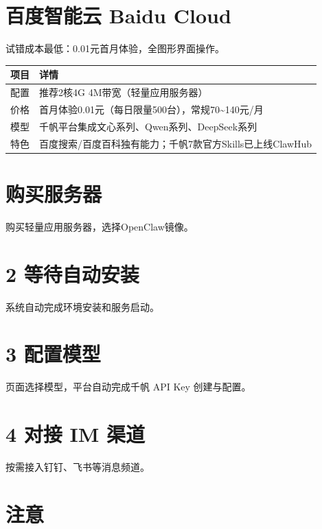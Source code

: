 \documentclass[
  10
]{article}
\newcounter{none} %
\begin{document}
\section{百度智能云 Baidu
Cloud}\label{ux767eux5ea6ux667aux80fdux4e91-baidu-cloud}

试错成本最低：0.01元首月体验，全图形界面操作。

{\def\LTcaptype{none} %
\begin{longtable}[]{@{}|l|l|@{}}
\toprule\noalign{}
\endhead
\bottomrule\noalign{}
\endlastfoot
\hline
项目 & 详情 \\
\hline
配置 & 推荐2核4G 4M带宽（轻量应用服务器） \\
\hline
价格 & 首月体验0.01元（每日限量500台），常规70\textasciitilde140元/月 \\
\hline
模型 & 千帆平台集成文心系列、Qwen系列、DeepSeek系列 \\
\hline
特色 & 百度搜索/百度百科独有能力；千帆7款官方Skills已上线ClawHub \\
\hline
\end{longtable}
}

\section{购买服务器}\label{ux8d2dux4e70ux670dux52a1ux5668}

购买轻量应用服务器，选择OpenClaw镜像。

\section{2 等待自动安装}\label{ux7b49ux5f85ux81eaux52a8ux5b89ux88c5}

系统自动完成环境安装和服务启动。

\section{3 配置模型}\label{ux914dux7f6eux6a21ux578b}

页面选择模型，平台自动完成千帆 API Key 创建与配置。

\section{4 对接 IM 渠道}\label{ux5bf9ux63a5-im-ux6e20ux9053}

按需接入钉钉、飞书等消息频道。

\section{注意}\label{ux6ce8ux610f-4}
\end{document}
